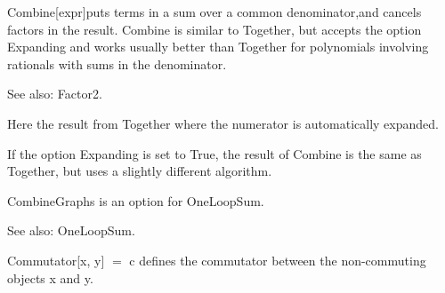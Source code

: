 




Combine[expr]puts terms in a sum over a common denominator,and cancels factors in the result. Combine is similar to Together, but accepts
  the option Expanding and works usually better than Together for polynomials involving rationals with sums in the denominator.



See also:  Factor2.




Here the result from Together where the numerator is automatically expanded.



If the option Expanding is set to True, the result of Combine is the same as Together, but uses a slightly different algorithm.





CombineGraphs is an option for OneLoopSum.

See also: { }OneLoopSum.



Commutator[x, y] \(=\) c defines the commutator between the non-commuting objects x and y. 


